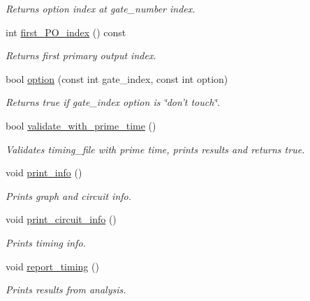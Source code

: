\begin{DoxyCompactItemize}
\begin{DoxyCompactList}\small\item\em Returns option index at gate\-\_\-number index. \end{DoxyCompactList}\item 
int \hyperlink{classTiming__Analysis_1_1Timing__Analysis_a5c2fd4b82fa80ea43fa1f519b230c8fe}{first\-\_\-\-P\-O\-\_\-index} () const 
\begin{DoxyCompactList}\small\item\em Returns first primary output index. \end{DoxyCompactList}\item 
bool \hyperlink{classTiming__Analysis_1_1Timing__Analysis_ad5d0274622ee3f7d2c2f3d731b35ac9a}{option} (const int gate\-\_\-index, const int option)
\begin{DoxyCompactList}\small\item\em Returns true if gate\-\_\-index option is \char`\"{}don't touch\char`\"{}. \end{DoxyCompactList}\item 
bool \hyperlink{classTiming__Analysis_1_1Timing__Analysis_aa4220574cd239b38b7905636a6a4e43b}{validate\-\_\-with\-\_\-prime\-\_\-time} ()
\begin{DoxyCompactList}\small\item\em Validates timing\-\_\-file with prime time, prints results and returns true. \end{DoxyCompactList}\item 
void \hyperlink{classTiming__Analysis_1_1Timing__Analysis_ad88fd0b79ae6d221a5691da10b0aa9e4}{print\-\_\-info} ()
\begin{DoxyCompactList}\small\item\em Prints graph and circuit info. \end{DoxyCompactList}\item 
void \hyperlink{classTiming__Analysis_1_1Timing__Analysis_a2c45b5a9fd71b7197a327593d54663a3}{print\-\_\-circuit\-\_\-info} ()
\begin{DoxyCompactList}\small\item\em Prints timing info. \end{DoxyCompactList}\item 
void \hyperlink{classTiming__Analysis_1_1Timing__Analysis_a6d3fd296c18a72b05d36addc14068e16}{report\-\_\-timing} ()
\begin{DoxyCompactList}\small\item\em Prints results from analysis. \end{DoxyCompactList}\end{DoxyCompactItemize}


